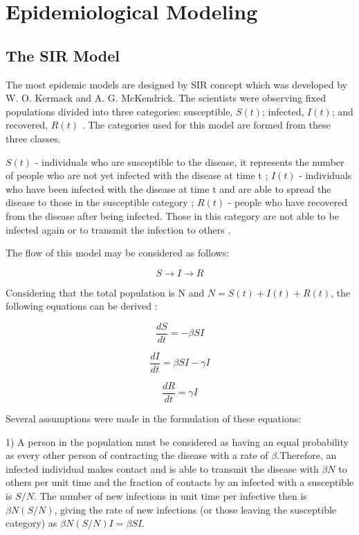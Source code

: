 \chapter{Epidemiological Modeling}

\section{The SIR Model}

The most epidemic models are designed by SIR concept which was developed by W. O. Kermack and A. G. McKendrick. The scientists were observing fixed populations divided into three categories: susceptible, $S(t)$; infected, $I(t)$; and recovered, $R(t)$ \cite{bib9}. The categories used for this model are formed from these three classes.

$S(t)$ - individuals who are susceptible to the disease, it represents the number of people who are not yet infected with the disease at time t \cite{bib9};
$I(t)$ - individuals who have been infected with the disease at time t and are able to spread the disease to those in the susceptible category \cite{bib9};
$R(t)$ - people who have recovered from the disease after being infected. Those in this category are not able to be infected again or to transmit the infection to others \cite{bib9}.

The flow of this model may be considered as follows:

\begin{equation}
S \rightarrow I \rightarrow R
\end{equation}

Considering that the total population is N and $N = S(t) + I(t) + R(t)$, the following equations can be derived \cite{bib10}:

\begin{equation}
\frac{dS}{dt} = -\beta S I
\end{equation}

\begin{equation}
\frac{dI}{dt} = \beta S I - \gamma I
\end{equation}

\begin{equation}
\frac{dR}{dt} = \gamma I
\end{equation}

Several assumptions were made in the formulation of these equations:

1) A person in the population must be considered as having an equal probability as every other person of contracting the disease with a rate of  $\beta$.Therefore, an infected individual makes contact and is able to transmit the disease with $\beta N$ to others per unit time and the fraction of contacts by an infected with a susceptible is $S/N$. The number of new infections in unit time per infective then is $\beta N (S/N)$, giving the rate of new infections (or those leaving the susceptible category) as $\beta N (S/N) I = \beta S I$. \cite{bib9}

